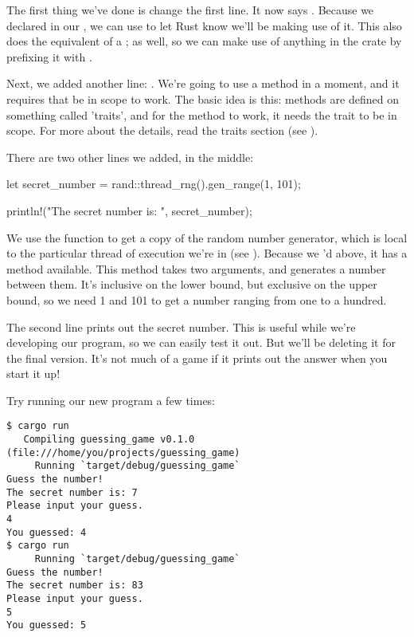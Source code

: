 The first thing we've done is change the first line. It now says . Because we declared  in 
our \code{[dependencies]}, we can use  to let Rust know we'll be making use of it. This also does the 
equivalent of a ; as well, so we can make use of anything in the  crate by prefixing it with 
.

\blank

Next, we added another  line: . We're going to use a method in a moment, and it requires that 
 be in scope to work. The basic idea is this: methods are defined on something called 'traits', and for the method 
to work, it needs the trait to be in scope. For more about the details, read the traits section (see ).

\blank

There are two other lines we added, in the middle:

\begin{rustc}
    let secret_number = rand::thread_rng().gen_range(1, 101);

    println!("The secret number is: {}", secret_number);
\end{rustc}

We use the  function to get a copy of the random number generator, which is local to the particular 
thread of execution we're in (see ). Because we 'd above, it has a 
 method available. This method takes two arguments, and generates a number between them. It's inclusive on the 
lower bound, but exclusive on the upper bound, so we need 1 and 101 to get a number ranging from one to a hundred.

\blank

The second line prints out the secret number. This is useful while we're developing our program, so we can easily test it out. 
But we'll be deleting it for the final version. It's not much of a game if it prints out the answer when you start it up!

\blank

Try running our new program a few times:

\begin{verbatim}
$ cargo run
   Compiling guessing_game v0.1.0 (file:///home/you/projects/guessing_game)
     Running `target/debug/guessing_game`
Guess the number!
The secret number is: 7
Please input your guess.
4
You guessed: 4
$ cargo run
     Running `target/debug/guessing_game`
Guess the number!
The secret number is: 83
Please input your guess.
5
You guessed: 5
\end{verbatim}

